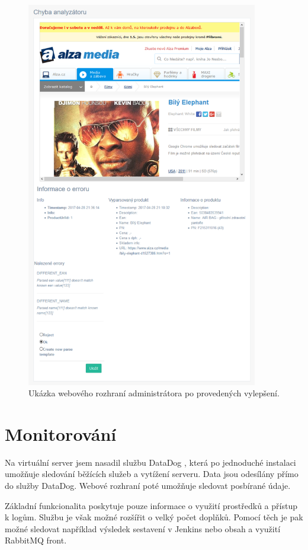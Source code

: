 \documentclass[thesis=B,czech]{FITthesis}[2012/06/26]
\begin{document}
\begin{figure}[H]\centering
 	\includegraphics[width=0.9\textwidth]{resources/analyser-err}
	\caption[Webové rozhraní pro vyřešení chyby analyzátoru po provedení vylepšení]{Ukázka webového rozhraní administrátora po provedených vylepšení. 
	}\label{fig:analyser-error}
\end{figure}

\section{Monitorování}
Na virtuální server jsem nasadil službu DataDog \cite{dataDog}, která po jednoduché instalaci umožňuje sledování běžících služeb
a vytížení serveru. Data jsou odesílány přímo do služby DataDog. Webové rozhraní poté umožňuje sledovat posbírané údaje.
\par
Základní funkcionalita poskytuje pouze informace o využití prostředků a přístup k logům. Službu je však možné rozšířit o velký počet doplňků. Pomocí těch je pak možné sledovat například výsledek sestavení v Jenkins nebo obsah a využití RabbitMQ front.
\end{document}
